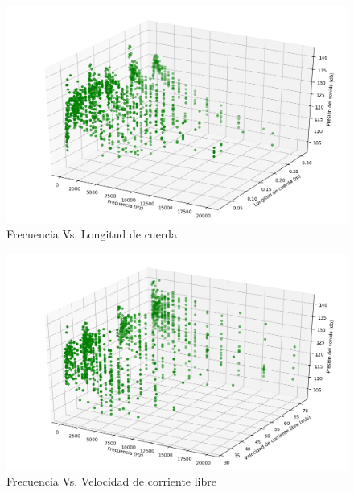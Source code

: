 \documentclass[12pt,spanish]{article} %
\begin{document}
\begin{figure}[H]
  \begin{center}
  \includegraphics[scale=.6]{Figure_2}
  \caption{Frecuencia Vs. Longitud de cuerda}
  \label{fig:Figure_2}
  \end{center}
\end{figure}

\begin{figure}[H]
  \begin{center}
  \includegraphics[scale=.6]{Figure_3}
  \caption{Frecuencia Vs. Velocidad de corriente libre}
  \label{fig:Figure_3}
  \end{center}
\end{figure}
\end{document}
